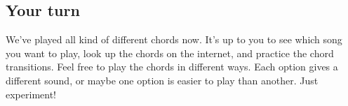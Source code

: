 \subsection{Your turn}

We've played all kind of different chords now. It's up to you to see which song you want to play, look up the chords on the internet, and practice the chord transitions. Feel free to play the chords in different ways. Each option gives a different sound, or maybe one option is easier to play than another. Just experiment!